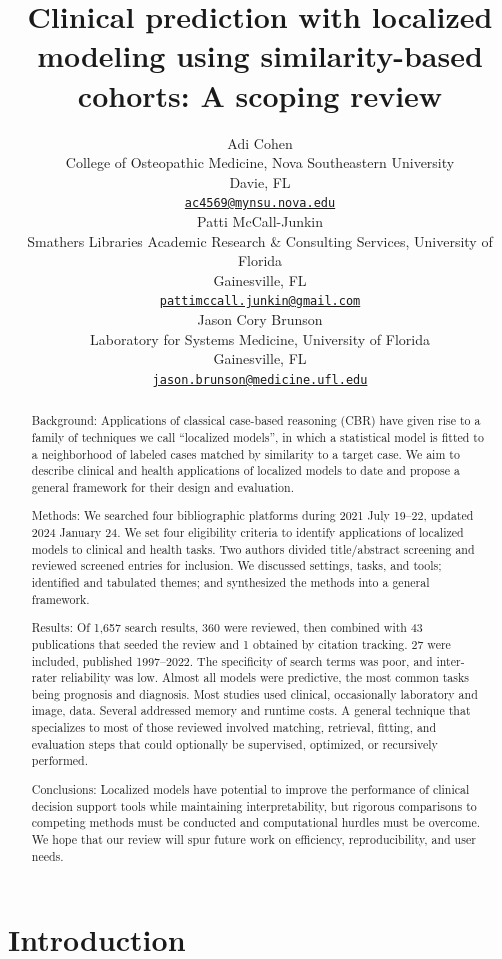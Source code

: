 \documentclass{article}
\title{Clinical prediction with localized modeling using
similarity-based cohorts: A scoping review}
\author{
    Adi Cohen
   \\
    College of Osteopathic Medicine, Nova Southeastern University \\
  Davie, FL \\
  \texttt{\href{mailto:ac4569@mynsu.nova.edu}{\nolinkurl{ac4569@mynsu.nova.edu}}} \\
   \And
    Patti McCall-Junkin
   \\
    Smathers Libraries Academic Research \& Consulting Services,
University of Florida \\
  Gainesville, FL \\
  \texttt{\href{mailto:pattimccall.junkin@gmail.com}{\nolinkurl{pattimccall.junkin@gmail.com}}} \\
   \And
    Jason Cory Brunson
   \\
    Laboratory for Systems Medicine, University of Florida \\
  Gainesville, FL \\
  \texttt{\href{mailto:jason.brunson@medicine.ufl.edu}{\nolinkurl{jason.brunson@medicine.ufl.edu}}} \\
  }
\begin{document}
\maketitle


\begin{abstract}
Background: Applications of classical case-based reasoning (CBR) have
given rise to a family of techniques we call ``localized models'', in
which a statistical model is fitted to a neighborhood of labeled cases
matched by similarity to a target case. We aim to describe clinical and
health applications of localized models to date and propose a general
framework for their design and evaluation.

Methods: We searched four bibliographic platforms during 2021 July
19--22, updated 2024 January 24. We set four eligibility criteria to
identify applications of localized models to clinical and health tasks.
Two authors divided title/abstract screening and reviewed screened
entries for inclusion. We discussed settings, tasks, and tools;
identified and tabulated themes; and synthesized the methods into a
general framework.

Results: Of 1,657 search results, 360 were reviewed, then combined with
43 publications that seeded the review and 1 obtained by citation
tracking. 27 were included, published 1997--2022. The specificity of
search terms was poor, and inter-rater reliability was low. Almost all
models were predictive, the most common tasks being prognosis and
diagnosis. Most studies used clinical, occasionally laboratory and
image, data. Several addressed memory and runtime costs. A general
technique that specializes to most of those reviewed involved matching,
retrieval, fitting, and evaluation steps that could optionally be
supervised, optimized, or recursively performed.

Conclusions: Localized models have potential to improve the performance
of clinical decision support tools while maintaining interpretability,
but rigorous comparisons to competing methods must be conducted and
computational hurdles must be overcome. We hope that our review will
spur future work on efficiency, reproducibility, and user needs.
\end{abstract}


\pagebreak

\hypertarget{introduction}{%
\section{Introduction}\label{introduction}}
\end{document}
